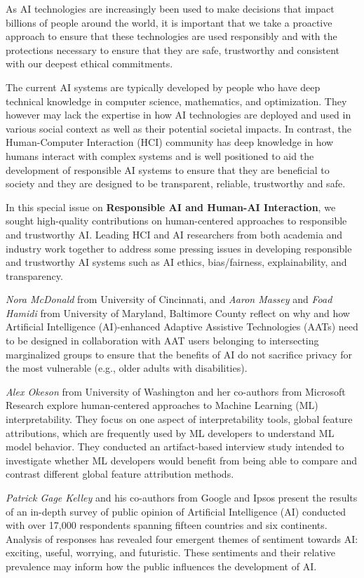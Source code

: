 \documentclass[11pt]{article}
\begin{document}
As AI technologies are increasingly been used to make decisions that impact billions of people around the world,  it is important that we take a proactive approach to ensure that these technologies are used responsibly and with the protections necessary to ensure that they are safe, trustworthy and consistent with our deepest ethical commitments. 
 
The current AI systems are typically developed by people who have deep technical knowledge in computer science, mathematics, and optimization. They however may lack the expertise in how AI technologies are deployed and used in various social context as well as their potential societal impacts.  In contrast, the Human-Computer Interaction (HCI) community has deep knowledge in how humans interact with complex systems and is well positioned to aid the development of responsible AI systems to ensure that they are beneficial to society and they are designed to be transparent, reliable, trustworthy and safe.  

In this special issue on \textbf{Responsible AI and Human-AI Interaction}, we sought high-quality contributions on human-centered approaches to responsible and trustworthy AI. Leading HCI and AI researchers from both academia and industry work together to address some pressing issues in developing responsible and trustworthy AI systems such as AI ethics, bias/fairness, explainability, and transparency. 
  
\textit{Nora McDonald} from University of Cincinnati, and \textit{Aaron Massey} and \textit{Foad Hamidi} from University of Maryland, Baltimore County reflect on why and how Artificial Intelligence (AI)-enhanced Adaptive Assistive Technologies (AATs) need to be designed in collaboration with AAT users belonging to intersecting marginalized groups to ensure that the benefits of AI do not sacrifice privacy for the most vulnerable (e.g., older adults with disabilities).   

\textit{Alex Okeson} from University of Washington and her co-authors from Microsoft Research explore human-centered approaches to Machine Learning (ML) interpretability. They focus on one aspect of interpretability tools, global feature attributions, which are frequently used by ML developers to understand ML model behavior. They conducted an artifact-based interview study intended to investigate whether ML developers would benefit from being able to compare and contrast different global feature attribution methods.

\textit{Patrick Gage Kelley} and his co-authors from Google and Ipsos present the results of an in-depth survey of public opinion of Artificial Intelligence (AI) conducted with over 17,000 respondents spanning fifteen countries and six continents. Analysis of responses has revealed four emergent themes of sentiment towards AI: exciting, useful, worrying, and futuristic. These sentiments and their relative prevalence may inform how the public influences the development of AI.   
\end{document}
